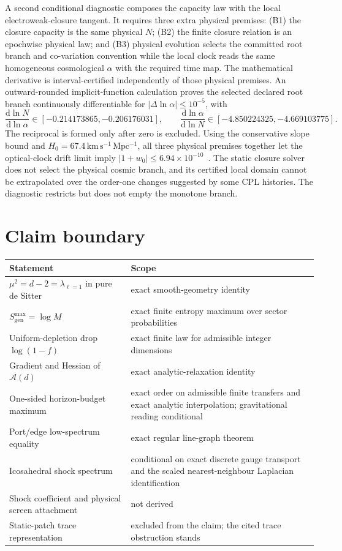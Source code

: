 \documentclass[11pt]{article}
\theoremstyle{remark}
\begin{document}
A second conditional diagnostic composes the capacity law with the local
electroweak-closure tangent. It requires three extra physical premises: (B1)
the closure capacity is the same physical \(N\); (B2) the finite closure
relation is an epochwise physical law; and (B3) physical evolution selects the
committed root branch and co-variation convention while the local clock reads
the same homogeneous cosmological \(\alpha\) with the required time map. The
mathematical derivative is interval-certified independently of those physical
premises. An outward-rounded implicit-function calculation proves the selected
declared root branch continuously differentiable for
\(\lvert\Delta\ln\alpha\rvert\le10^{-5}\), with
\[
 \frac{\mathrm d\ln N}{\mathrm d\ln\alpha}
 \in[-0.214173865,-0.206176031],\qquad
 \frac{\mathrm d\ln\alpha}{\mathrm d\ln N}
 \in[-4.850224325,-4.669103775].
\]
The reciprocal is formed only after zero is excluded. Using the conservative
slope bound and \(H_0=67.4\,\mathrm{km\,s^{-1}\,Mpc^{-1}}\), all three
physical premises together let the optical-clock drift limit imply
\(\lvert1+w_0\rvert\le6.94\times10^{-10}\)~\cite{filzinger2023}. The static
closure solver does not select the physical cosmic branch, and its certified
local domain cannot be extrapolated over the order-one changes suggested by
some CPL histories. The diagnostic restricts but does not empty the monotone
branch.

\section{Claim boundary}

\begin{center}
\begin{tabular}{@{}p{}p{}@{}}
\toprule
Statement & Scope \\
\midrule
\(\mu^2=d-2=\lambda_{\ell=1}\) in pure de Sitter &
exact smooth-geometry identity \\
\(S_{\mathrm{gen}}^{\max}=\log M\) &
exact finite entropy maximum over sector probabilities \\
Uniform-depletion drop \(\log(1-f)\) &
exact finite law for admissible integer dimensions \\
Gradient and Hessian of \(\mathcal A(d)\) &
exact analytic-relaxation identity \\
One-sided horizon-budget maximum &
exact order on admissible finite transfers and exact analytic interpolation;
gravitational reading conditional \\
Port/edge low-spectrum equality &
exact regular line-graph theorem \\
Icosahedral shock spectrum &
conditional on exact discrete gauge transport and the scaled
nearest-neighbour Laplacian identification \\
Shock coefficient and physical screen attachment &
not derived \\
Static-patch trace representation &
excluded from the claim; the cited trace obstruction stands \\
\bottomrule
\end{tabular}
\end{center}
\end{document}
